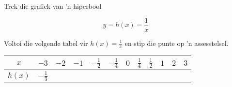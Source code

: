 \begin{wex}
{Trek die grafiek van 'n hiperbool}
{
\begin{equation*}
 y = h(x) = \frac{1}{x}
\end{equation*}

Voltoi die volgende tabel vir $h(x) = \frac{1}{x}$ en stip die punte op 'n assesstelsel.

\begin{table}[H]
\begin{center}
\begin{tabular}{|c|c|c|c|c|c|c|c|c|c|c|c|}
\hline
  $x$ &  $-3$ & $-2$ & $-1$ & $-\frac{1}{2}$ & $-\frac{1}{4}$ &$0$&$\frac{1}{4}$&$\frac{1}{2}$&$1$&$2$&$3$
\\ \hline
 $h(x)$& $-\frac{1}{3}$ &&&&&&&&&&
\\ \hline
\end{tabular}
\end{center}
\end{table}


}
\end{wex}
